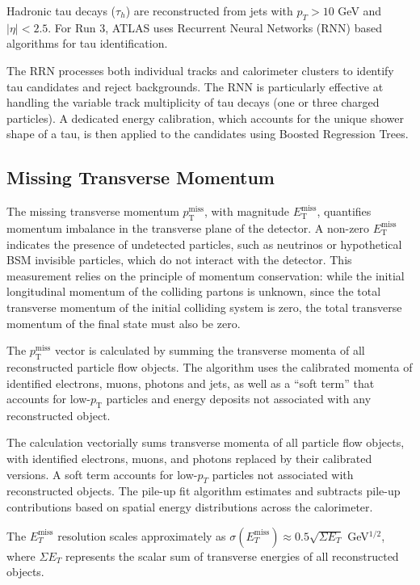 Hadronic tau decays ($\tau_h$) are reconstructed from jets with $p_T > 10$ GeV and $|\eta| < 2.5$. For Run 3, ATLAS uses Recurrent Neural Networks (RNN) based algorithms for tau identification.

The RRN processes both individual tracks and calorimeter clusters to identify tau candidates and reject backgrounds. The RNN is particularly effective at handling the variable track multiplicity of tau decays (one or three charged particles). A dedicated energy calibration, which accounts for the unique shower shape of a tau, is then applied to the candidates using Boosted Regression Trees.

\subsection{Missing Transverse Momentum}

The missing transverse momentum $p_\text{T}^\text{miss}$, with magnitude $E_\text{T}^{\text{miss}}$, quantifies momentum imbalance in the transverse plane of the detector. A non-zero $E_\text{T}^{\text{miss}}$ indicates the presence of undetected particles, such as neutrinos or hypothetical BSM invisible particles, which do not interact with the detector. This measurement relies on the principle of momentum conservation: while the initial longitudinal momentum of the colliding partons is unknown, since the total transverse momentum of the initial colliding system is zero, the total transverse momentum of the final state must also be zero.

The $p_\text{T}^\text{miss}$ vector is calculated by summing the transverse momenta of all reconstructed particle flow objects. The algorithm uses the calibrated momenta of identified electrons, muons, photons and jets, as well as a ``soft term'' that accounts for low-$p_\text{T}$ particles and energy deposits not associated with any reconstructed object. 

The calculation vectorially sums transverse momenta of all particle flow objects, with identified electrons, muons, and photons replaced by their calibrated versions. A soft term accounts for low-$p_T$ particles not associated with reconstructed objects. The pile-up fit algorithm estimates and subtracts pile-up contributions based on spatial energy distributions across the calorimeter.

The $E_T^{\text{miss}}$ resolution scales approximately as $\sigma(E_T^{\text{miss}}) \approx 0.5\sqrt{\Sigma E_T}$ GeV$^{1/2}$, where $\Sigma E_T$ represents the scalar sum of transverse energies of all reconstructed objects. 